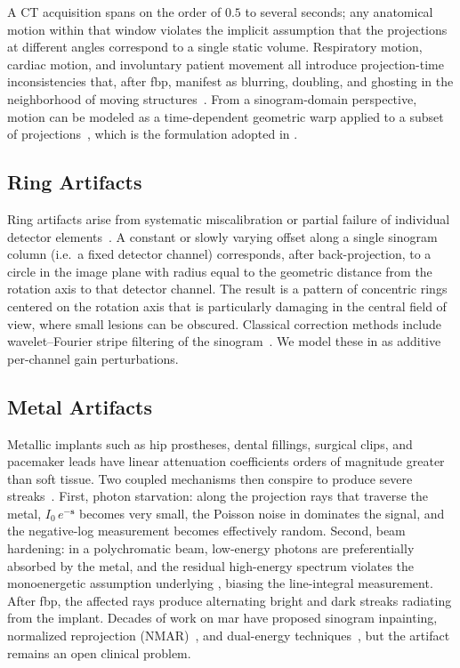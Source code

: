 A CT acquisition spans on the order of $0.5$ to several seconds; any anatomical motion within that window violates the implicit assumption that the projections at different angles correspond to a single static volume. Respiratory motion, cardiac motion, and involuntary patient movement all introduce projection-time inconsistencies that, after \gls{fbp}, manifest as blurring, doubling, and ghosting in the neighborhood of moving structures~\cite{LuMackie2002, Lu2005, Boas2012}. From a sinogram-domain perspective, motion can be modeled as a time-dependent geometric warp applied to a subset of projections~\cite{Mao2007}, which is the formulation adopted in .

\subsection{Ring Artifacts}
\label{subsec:bg_ring}

Ring artifacts arise from systematic miscalibration or partial failure of individual detector elements~\cite{Sijbers2004, Prell2009}. A constant or slowly varying offset along a single sinogram column (i.e.\ a fixed detector channel) corresponds, after back-projection, to a circle in the image plane with radius equal to the geometric distance from the rotation axis to that detector channel. The result is a pattern of concentric rings centered on the rotation axis that is particularly damaging in the central field of view, where small lesions can be obscured. Classical correction methods include wavelet--Fourier stripe filtering of the sinogram~\cite{Munch2009}. We model these in  as additive per-channel gain perturbations.

\subsection{Metal Artifacts}
\label{subsec:bg_metal}

Metallic implants such as hip prostheses, dental fillings, surgical clips, and pacemaker leads have linear attenuation coefficients orders of magnitude greater than soft tissue. Two coupled mechanisms then conspire to produce severe streaks~\cite{ZhangYu2018, Gjesteby2016}. First, photon starvation: along the projection rays that traverse the
metal, $I_0\,e^{-\boldsymbol{s}}$ becomes very small, the Poisson noise in  dominates the signal, and the negative-log measurement becomes effectively random. Second, beam hardening: in a polychromatic beam, low-energy photons are preferentially absorbed by the metal, and the residual high-energy spectrum violates the monoenergetic assumption underlying , biasing the line-integral measurement. After \gls{fbp}, the affected rays produce alternating bright and dark streaks radiating from the implant. Decades of work on \gls{mar} have proposed sinogram inpainting, normalized reprojection (NMAR)~\cite{Meyer2010NMAR}, and dual-energy techniques~\cite{Gjesteby2016}, but the artifact remains an open clinical problem.

